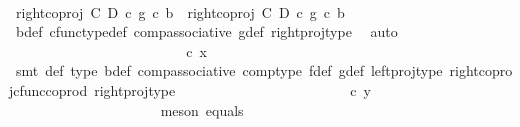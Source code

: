 \begin{isabellebody}
\ \ \ \ \ \ \ \ \ \ \ \ \ \ \ \ \ \isamarkupfalse%
\ {\isacharminus}{\kern0pt}\ \isanewline
\ \ \ \ \ \ \ \ \ \ \ \ \ \ \ \ \ \ \isamarkupfalse%
\ {\isachardoublequoteopen}right{\isacharunderscore}{\kern0pt}coproj\ C\ D\ {\isasymcirc}\isactrlsub c\ {\isacharparenleft}{\kern0pt}g\ {\isasymcirc}\isactrlsub c\ b{\isacharparenright}{\kern0pt}\ {\isacharequal}{\kern0pt}\ {\isacharparenleft}{\kern0pt}right{\isacharunderscore}{\kern0pt}coproj\ C\ D\ {\isasymcirc}\isactrlsub c\ g{\isacharparenright}{\kern0pt}\ {\isasymcirc}\isactrlsub c\ b{\isachardoublequoteclose}\isanewline
\ \ \ \ \ \ \ \ \ \ \ \ \ \ \ \ \ \ \ \ \isamarkupfalse%
\ b{\isacharunderscore}{\kern0pt}def\ cfunc{\isacharunderscore}{\kern0pt}type{\isacharunderscore}{\kern0pt}def\ comp{\isacharunderscore}{\kern0pt}associative\ g{\isacharunderscore}{\kern0pt}def\ right{\isacharunderscore}{\kern0pt}proj{\isacharunderscore}{\kern0pt}type\ \isamarkupfalse%
\ auto\isanewline
\ \ \ \ \ \ \ \ \ \ \ \ \ \ \ \ \ \ \isamarkupfalse%
\ \isamarkupfalse%
\ {\isachardoublequoteopen}{\isachardot}{\kern0pt}{\isachardot}{\kern0pt}{\isachardot}{\kern0pt}\ \ {\isacharequal}{\kern0pt}\ {\isasymphi}\ {\isasymcirc}\isactrlsub c\ x{\isachardoublequoteclose}\isanewline
\ \ \ \ \ \ \ \ \ \ \ \ \ \ \ \ \ \ \ \ \isamarkupfalse%
\ {\isacharparenleft}{\kern0pt}smt\ {\isasymphi}{\isacharunderscore}{\kern0pt}def\ {\isasymphi}{\isacharunderscore}{\kern0pt}type\ b{\isacharunderscore}{\kern0pt}def\ comp{\isacharunderscore}{\kern0pt}associative{}\ comp{\isacharunderscore}{\kern0pt}type\ f{\isacharunderscore}{\kern0pt}def{\isacharparenleft}{\kern0pt}{}{\isacharparenright}{\kern0pt}\ g{\isacharunderscore}{\kern0pt}def{\isacharparenleft}{\kern0pt}{}{\isacharparenright}{\kern0pt}\ left{\isacharunderscore}{\kern0pt}proj{\isacharunderscore}{\kern0pt}type\ right{\isacharunderscore}{\kern0pt}coproj{\isacharunderscore}{\kern0pt}cfunc{\isacharunderscore}{\kern0pt}coprod\ right{\isacharunderscore}{\kern0pt}proj{\isacharunderscore}{\kern0pt}type{\isacharparenright}{\kern0pt}\isanewline
\ \ \ \ \ \ \ \ \ \ \ \ \ \ \ \ \ \ \isamarkupfalse%
\ \isamarkupfalse%
\ {\isachardoublequoteopen}{\isachardot}{\kern0pt}{\isachardot}{\kern0pt}{\isachardot}{\kern0pt}\ {\isacharequal}{\kern0pt}\ {\isasymphi}\ {\isasymcirc}\isactrlsub c\ y{\isachardoublequoteclose}\isanewline
\ \ \ \ \ \ \ \ \ \ \ \ \ \ \ \ \ \ \ \ \isamarkupfalse%
\ {\isacharparenleft}{\kern0pt}meson\ equals{\isacharparenright}{\kern0pt}\isanewline

\end{isabellebody}
